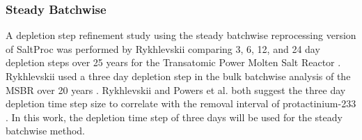 \subsubsection{Steady Batchwise}
\label{s:steady-batch-mesh}

A depletion step refinement study using the steady batchwise reprocessing version of SaltProc was performed by Rykhlevskii comparing 3, 6, 12, and 24 day depletion steps over 25 years for the Transatomic Power Molten Salt Reactor \cite{rykhlevskii_fuel_2020}. Rykhlevskii used a three day depletion step in the bulk batchwise analysis of the MSBR over 20 years \cite{rykhlevskii_advanced_2018}. Rykhlevskii and Powers et al. both suggest the three day depletion time step size to correlate with the removal interval of protactinium-233 \cite{rykhlevskii_fuel_2020, powers_new_2013}. In this work, the depletion time step of three days will be used for the steady batchwise method.






